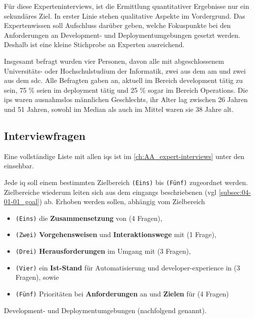 Für diese Experteninterviews, ist die Ermittlung quantitativer Ergebnisse nur ein sekundäres Ziel. In erster Linie stehen qualitative Aspekte im Vordergrund. Das Expertenwissen soll Aufschluss darüber geben, welche Fokuspunkte bei den Anforderungen an Development- und Deploymentumgebungen gesetzt werden. Deshalb ist eine kleine Stichprobe an Experten ausreichend.

Insgesamt befragt wurden vier Personen, davon alle mit abgeschlossenem Universitäts- oder Hochschulstudium der Informatik, zwei aus dem \Gls{am} und zwei aus dem \Gls{sdc}. Alle Befragten gaben an, aktuell im Bereich \Gls{development} tätig zu sein, 75 \% seien im \Gls{deployment} tätig und 25 \% sogar im Bereich Operations. Die \Glspl{ip} waren ausnahmslos männlichen Geschlechts, ihr Alter lag zwischen 26 Jahren und 51 Jahren, sowohl im Median als auch im Mittel waren sie 38 Jahre alt.

\subsection{Interviewfragen}
\label{subsec:04-01-03_interview-questions}

Eine vollständige Liste mit allen \Glspl{iq} ist im \autoref{ch:AA_expert-interviews} unter den  einsehbar.

Jede \acrfull{iq} soll einem bestimmten Zielbereich \texttt{(Eins)} bis \texttt{(Fünf)} zugeordnet werden. Zielbereiche wiederum leiten sich aus dem eingangs beschriebenen  (\acrshort{vgl} \autoref{subsec:04-01-01_goal}) ab. Erhoben werden sollen, abhängig vom Zielbereich

\begin{itemize}
    \item \texttt{(Eins)} die \textbf{Zusammensetzung} von (4 Fragen),
    \item \texttt{(Zwei)} \textbf{Vorgehensweisen} und \textbf{Interaktionswege} mit (1 Frage),
    \item \texttt{(Drei)} \textbf{Herausforderungen} im Umgang mit (3 Fragen),
    \item \texttt{(Vier)} ein \textbf{Ist-Stand} für Automatisierung und \Gls{developer-experience} in (3 Fragen), sowie
    \item \texttt{(Fünf)} Prioritäten bei \textbf{Anforderungen} an und \textbf{Zielen} für (4 Fragen)
\end{itemize}

Development- und Deploymentumgebungen (nachfolgend  genannt).

